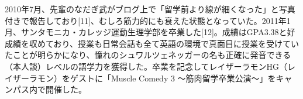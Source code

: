2010年7月、先輩のなだぎ武がブログ上で「留学前より線が細くなった」と写真付きで報告しており[11]、むしろ筋力的にも衰えた状態となっていた。2011年1月、サンタモニカ・カレッジ運動生理学部を卒業した[12]。成績はGPA3.38と好成績を収めており、授業も日常会話も全て英語の環境で真面目に授業を受けていたことが明らかになり、憧れのシュワルツェネッガーの名も正確に発音できる（本人談）レベルの語学力を獲得した。卒業を記念してレイザーラモンHG（レイザーラモン）をゲストに「Muscle Comedy 3 〜筋肉留学卒業公演〜」をキャンパス内で開催した。